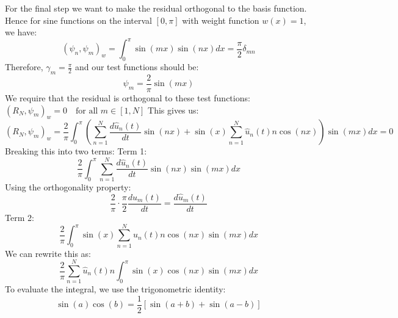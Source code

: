 For the final step we want to make the residual orthogonal to the basis function. Hence for sine functions on the interval $[0,\pi]$ with weight function $w(x)=1$, we have:
\begin{equation}
	(\psi_n, \psi_m)_w = \int_0^{\pi} \sin(mx)\sin(nx) dx = \frac{\pi}{2}\delta_{mn}
	\label{eq:weight_f}
\end{equation}
Therefore, $\gamma_m = \frac{\pi}{2}$ and our test functions should be:
\begin{equation}
\psi_m = \frac{2}{\pi}\sin(mx)
	\label{eq:test2}
\end{equation}
We require that the residual is orthogonal to these test functions:
$(R_N, \psi_m)_w = 0 \quad \text{for all } m \in[1, N]$
This gives us:
\begin{equation}
	\left(R_N, \psi_m\right)_w  = \frac{2}{\pi} \int_0^{\pi} \left ( \sum_{n=1}^{N} \frac{d\hat{u}_n(t)}{dt} \sin(nx) + \sin(x)  \sum_{n=1}^{N} \hat{u}_n(t) n \cos(nx) \right) \sin(mx) dx = 0
	\label{eq:res_der}
\end{equation}
Breaking this into two terms:
Term 1:
$$\frac{2}{\pi}\int_0^{\pi} \sum_{n=1}^{N} \frac{d\hat{u}_n(t)}{dt} \sin(nx)\sin(mx) dx$$
Using the orthogonality property:
$$\frac{2}{\pi} \cdot \frac{\pi}{2} \frac{d\hat{u}_m(t)}{dt} = \frac{d\hat{u}_m(t)}{dt}$$
Term 2:
$$\frac{2}{\pi}\int_0^{\pi} \sin(x)\sum_{n=1}^{N} \hat{u}_n(t) n\cos(nx)\sin(mx) dx$$
We can rewrite this as:
$$\frac{2}{\pi}\sum_{n=1}^{N} \hat{u}_n(t) n \int_0^{\pi} \sin(x)\cos(nx)\sin(mx) dx$$
To evaluate the integral, we use the trigonometric identity:
$$\sin(a)\cos(b) = \frac{1}{2}[\sin(a+b) + \sin(a-b)]$$
